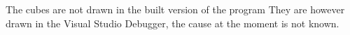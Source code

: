 
\begin{DoxyRefList}
\item[\label{bug__bug000001}%
\hypertarget{bug__bug000001}{}%
global\+Scope$>$ Member \hyperlink{_voxel_task_8cpp_a0ddf1224851353fc92bfbff6f499fa97}{main} (int argc, char $\ast$argv\mbox{[}\mbox{]})]The cubes are not drawn in the built version of the program They are however drawn in the Visual Studio Debugger, the cause at the moment is not known. 
\end{DoxyRefList}